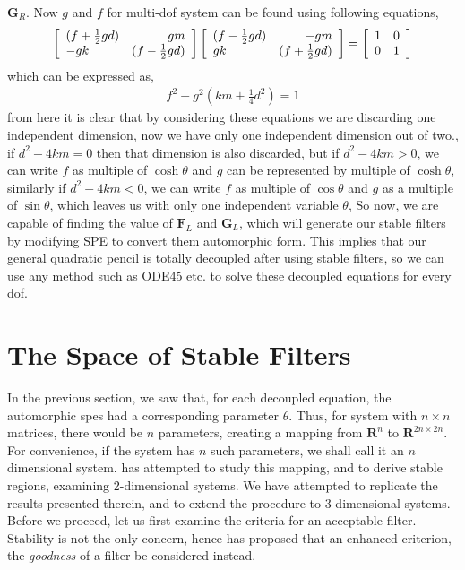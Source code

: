 $\mathbf{G}_R$. Now $g$ and $f$ for multi-\gls{dof} system can be found 
using following equations,
\begin{align}\left[ \begin{array}{lr} (f + \frac{1}{2}gd)& gm\\ -gk& (f - \frac{1}{2}gd)\end{array}\right]\left[ \begin{array}{lr} (f - \frac{1}{2}gd)& -gm\\ gk& (f + \frac{1}{2}gd)\end{array}\right] = \left[ \begin{array}{lr} 1& {0}\\ 0& 1\end{array}\right]\end{align}
which can be expressed as,
\begin{align}f^2 + g^2(km + \frac{1}{4}d^2) = 1\end{align}
from here it is clear that by considering these equations we are 
discarding one independent dimension, now we have only one independent 
dimension out of two., if $d^2 - 4km = 0$ then that dimension is also 
discarded, but if $d^2 - 4km > 0$, we can write $f$ as multiple of 
$\cosh{\theta}$ and $g$ can be represented by multiple of $\cosh{\theta}$, 
similarly if $d^2 - 4km < 0$, we can write $f$ as multiple of 
$\cos{\theta}$ and $g$ as a multiple of $\sin{\theta}$, which leaves us 
with only one independent variable $\theta$, So now, we are capable of 
finding the value of $\mathbf{F}_L$ and $\mathbf{G}_L$, which will 
generate our stable filters by modifying SPE to convert them automorphic 
form. This implies that our general quadratic pencil is totally decoupled 
after using stable filters, so we can use any method such as ODE45 etc. 
to solve these decoupled equations for every \gls{dof}.

\section{The Space of Stable Filters}
In the previous section, we saw that, for each decoupled equation, the 
automorphic \glspl{spe} had a corresponding parameter $\theta$. Thus, for 
system with $n \times n$ matrices, there would be $n$ parameters, creating 
a mapping from $\mathbf{R}^{n}$ to $\mathbf{R}^{2n \times 2n}$. For 
convenience, if the system has $n$ such parameters, we shall call it an 
$n$ dimensional system. \cite{Jiffri2011} has attempted to study this 
mapping, and to derive stable regions, examining 2-dimensional systems. 
We have attempted to replicate the results presented therein, and to 
extend the procedure to 3 dimensional systems. Before we proceed, let us 
first examine the criteria for an acceptable filter. Stability is not the 
only concern, hence \cite{Jiffri2011} has proposed that an enhanced 
criterion, the \emph{goodness} of a filter be considered instead.

